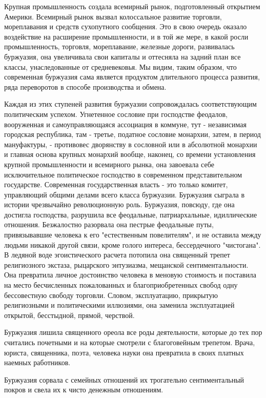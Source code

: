 \documentclass[12pt]{article}
\newcommand{\parnum}{(\arabic{parcount})}
\newcounter{parcount}
\newenvironment{parnumbers}{%
  \par%
  \everypar{\noindent \stepcounter{parcount}\marginpar[]{\parnum}}%
}{}
\begin{document}
\begin{parnumbers}
    Крупная промышленность создала всемирный рынок, подготовленный открытием Америки. Всемирный рынок вызвал колоссальное развитие торговли, мореплавания и средств сухопутного сообщения. Это в свою очередь оказало воздействие на расширение промышленности, и в той же мере, в какой росли промышленность, торговля, мореплавание, железные дороги, развивалась буржуазия, она увеличивала свои капиталы и оттесняла на задний план все классы, унаследованные от средневековья. Мы видим, таким образом, что современная буржуазия сама является продуктом длительного процесса развития, ряда переворотов в способе производства и обмена.

    Каждая из этих ступеней развития буржуазии сопровождалась соответствующим политическим успехом. Угнетенное сословие при господстве феодалов, вооруженная и самоуправляющаяся ассоциация в коммуне, тут - независимая городская республика, там - третье, податное сословие монархии, затем, в период мануфактуры, - противовес дворянству в сословной или в абсолютной монархии и главная основа крупных монархий вообще, наконец, со времени установления крупной промышленности и всемирного рынка, она завоевала себе исключительное политическое господство в современном представительном государстве. Современная государственная власть - это только комитет, управляющий общими делами всего класса буржуазии. Буржуазия сыграла в истории чрезвычайно революционную роль. Буржуазия, повсюду, где она достигла господства, разрушила все феодальные, патриархальные, идиллические отношения. Безжалостно разорвала она пестрые феодальные путы, привязывавшие человека к его "естественным повелителям", и не оставила между людьми никакой другой связи, кроме голого интереса, бессердечного "чистогана". В ледяной воде эгоистического расчета потопила она священный трепет религиозного экстаза, рыцарского энтузиазма, мещанской сентиментальности. Она превратила личное достоинство человека в меновую стоимость и поставила на место бесчисленных пожалованных и благоприобретенных свобод одну бессовестную свободу торговли. Словом, эксплуатацию, прикрытую религиозными и политическими иллюзиями, она заменила эксплуатацией открытой, бесстыдной, прямой, черствой.

    Буржуазия лишила священного ореола все роды деятельности, которые до тех пор считались почетными и на которые смотрели с благоговейным трепетом. Врача, юриста, священника, поэта, человека науки она превратила в своих платных наемных работников.

    Буржуазия сорвала с семейных отношений их трогательно сентиментальный покров и свела их к чисто денежным отношениям.


\end{parnumbers}
\end{document}
